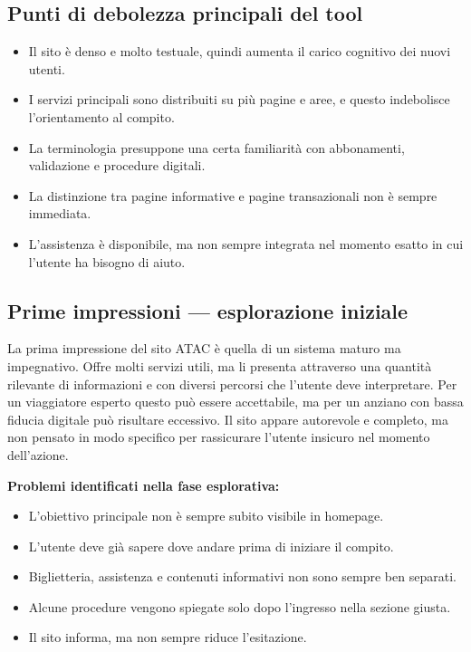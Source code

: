 \documentclass[11pt,a4paper]{article}
\begin{document}
\subsection*{Punti di debolezza principali del tool}

\begin{itemize}
    \item Il sito è denso e molto testuale, quindi aumenta il carico cognitivo dei nuovi utenti.
    \item I servizi principali sono distribuiti su più pagine e aree, e questo indebolisce l’orientamento al compito.
    \item La terminologia presuppone una certa familiarità con abbonamenti, validazione e procedure digitali.
    \item La distinzione tra pagine informative e pagine transazionali non è sempre immediata.
    \item L’assistenza è disponibile, ma non sempre integrata nel momento esatto in cui l’utente ha bisogno di aiuto.
\end{itemize}

\subsection*{Prime impressioni — esplorazione iniziale}

\noindent La prima impressione del sito ATAC è quella di un sistema maturo ma impegnativo. Offre molti servizi utili, ma li presenta attraverso una quantità rilevante di informazioni e con diversi percorsi che l’utente deve interpretare. Per un viaggiatore esperto questo può essere accettabile, ma per un anziano con bassa fiducia digitale può risultare eccessivo. Il sito appare autorevole e completo, ma non pensato in modo specifico per rassicurare l’utente insicuro nel momento dell’azione.

\noindent\textbf{Problemi identificati nella fase esplorativa:}

\begin{itemize}
    \item L’obiettivo principale non è sempre subito visibile in homepage.
    \item L’utente deve già sapere dove andare prima di iniziare il compito.
    \item Biglietteria, assistenza e contenuti informativi non sono sempre ben separati.
    \item Alcune procedure vengono spiegate solo dopo l’ingresso nella sezione giusta.
    \item Il sito informa, ma non sempre riduce l’esitazione.
\end{itemize}
\end{document}
